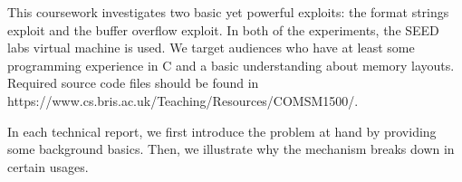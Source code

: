 This coursework investigates two basic yet powerful exploits: the format strings exploit and the buffer overflow exploit. In both of the experiments, the SEED labs virtual machine is used. We target audiences who have at least some programming experience in C and a basic understanding about memory layouts. Required source code files should be found in https://www.cs.bris.ac.uk/Teaching/Resources/COMSM1500/.

In each technical report, we first introduce the problem at hand by providing some background basics. Then, we illustrate why the mechanism breaks down in certain usages.